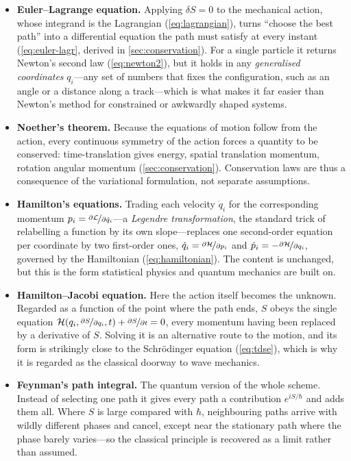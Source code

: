         \begin{itemize}
            \item \textbf{Euler--Lagrange equation.} Applying $\delta S = 0$ to the mechanical action, whose integrand is the Lagrangian (\cref{eq:lagrangian}), turns \enquote{choose the best path} into a differential equation the path must satisfy at every instant (\cref{eq:euler-lagr}, derived in \cref{sec:conservation}). For a single particle it returns Newton's second law (\cref{eq:newton2}), but it holds in any \emph{generalised coordinates} $q_i$---any set of numbers that fixes the configuration, such as an angle or a distance along a track---which is what makes it far easier than Newton's method for constrained or awkwardly shaped systems.
            \item \textbf{Noether's theorem.} Because the equations of motion follow from the action, every continuous symmetry of the action forces a quantity to be conserved: time-translation gives energy, spatial translation momentum, rotation angular momentum (\cref{sec:conservation}). Conservation laws are thus a consequence of the variational formulation, not separate assumptions.
            \item \textbf{Hamilton's equations.} Trading each velocity $\dot{q}_i$ for the corresponding momentum $p_i = \nicefrac{\partial \mathcal{L}}{\partial \dot{q}_i}$---a \emph{Legendre transformation}, the standard trick of relabelling a function by its own slope---replaces one second-order equation per coordinate by two first-order ones, $\dot{q}_i = \nicefrac{\partial \mathcal{H}}{\partial p_i}$ and $\dot{p}_i = -\nicefrac{\partial \mathcal{H}}{\partial q_i}$, governed by the Hamiltonian (\cref{eq:hamiltonian}). The content is unchanged, but this is the form statistical physics and quantum mechanics are built on.
            \item \textbf{Hamilton--Jacobi equation.} Here the action itself becomes the unknown. Regarded as a function of the point where the path ends, $S$ obeys the single equation $\mathcal{H}\!\left(q_i,\nicefrac{\partial S}{\partial q_i},t\right) + \nicefrac{\partial S}{\partial t} = 0$, every momentum having been replaced by a derivative of $S$. Solving it is an alternative route to the motion, and its form is strikingly close to the Schrödinger equation (\cref{eq:tdse}), which is why it is regarded as the classical doorway to wave mechanics.
            \item \textbf{Feynman's path integral.} The quantum version of the whole scheme. Instead of selecting one path it gives every path a contribution $e^{iS/\hbar}$ and adds them all. Where $S$ is large compared with $\hbar$, neighbouring paths arrive with wildly different phases and cancel, except near the stationary path where the phase barely varies---so the classical principle is recovered as a limit rather than assumed.

\end{itemize}

